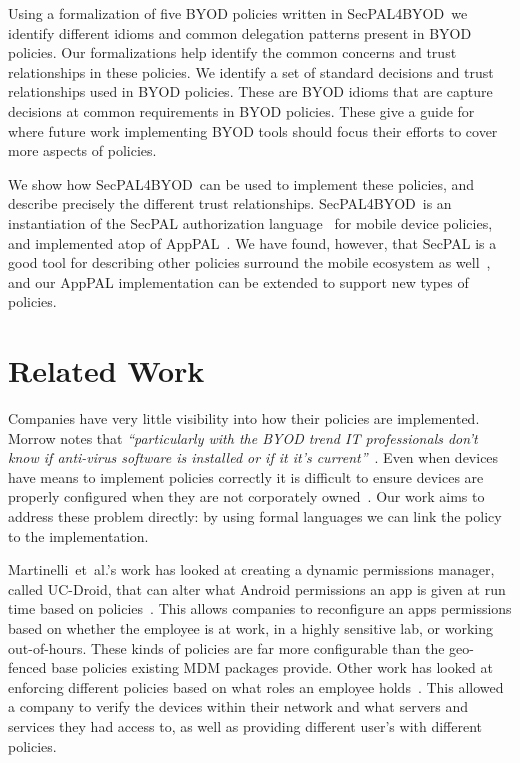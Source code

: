 \documentclass{llncs}
\makeatletter
\newcommand{\etal}{et~al.\@}
\newcommand{\AppPAL}[0]{SecPAL4BYOD}
\makeatother
\begin{document}
Using a formalization of five BYOD policies written in \AppPAL~we identify different idioms and common delegation patterns present in BYOD policies.
Our formalizations help identify the common concerns and trust relationships in these policies.
We identify a set of standard decisions and trust relationships used in BYOD policies.
These are BYOD idioms that are capture decisions at common requirements in BYOD policies.
These give a guide for where future work implementing BYOD tools should focus their efforts to cover more aspects of policies.

We show how \AppPAL~can be used to implement these policies, and describe precisely the different trust relationships.
\AppPAL~is an instantiation of the SecPAL authorization language~\cite{becker_secpal:_2010} for mobile device policies, and implemented atop of AppPAL~\cite{hallett_apppal_2016}.
We have found, however, that SecPAL is a good tool for describing other policies surround the mobile ecosystem as well~\cite{hallett_specifying_2016}, and our AppPAL implementation can be extended to support new types of policies.

\section{Related Work}
\label{sec:related}

Companies have very little visibility into how their policies are implemented.
Morrow notes that \emph{``particularly with the BYOD trend IT professionals don't know if anti-virus software is installed or if it it's current''}~\cite{morrow_byod_2012}.
Even when devices have means to implement policies correctly it is difficult to ensure devices are properly configured when they are not corporately owned~\cite{tokuyoshi_security_2013}.
Our work aims to address these problem directly: by using formal languages we can link the policy to the implementation.

Martinelli~\etal{}'s work has looked at creating a dynamic permissions manager, called UC-Droid,
that can alter what Android permissions an app is given at run time based on policies~\cite{martinelli_enhancing_2016}.
This allows companies to reconfigure an apps permissions based on whether the employee is at work, in a highly sensitive lab, or working out-of-hours.
These kinds of policies are far more configurable than the geo-fenced base policies existing MDM packages provide.
Other work has looked at enforcing different policies based on what roles an employee holds~\cite{costantino_towards_2013}.
This allowed a company to verify the devices within their network and what servers and services they had access to, as well as providing different user's with different policies.
\end{document}

